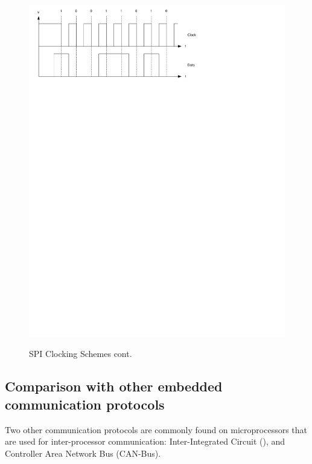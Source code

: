 \begin{figure}[ptb]
\begin{centering}
{			\includegraphics[width=6in]{SPI/Figures/spi-clocking_schemes_fall_delay.pdf}
			\label{fig:spi:clocking_schemes_fall_delay}
		}
		\caption{SPI Clocking Schemes cont.}
		\label{fig:spi:clocking_schemes-continue_1}
	\end{centering}
\end{figure}

\subsection{Comparison with other embedded communication protocols}\label{sec:spi:background:comparison}

Two other communication protocols are commonly found on microprocessors that are used for inter-processor communication: Inter-Integrated Circuit (), and Controller Area Network Bus (CAN-Bus).

